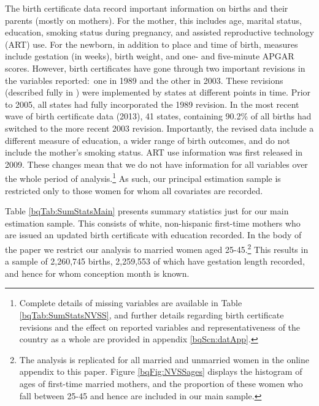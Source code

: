\documentclass[a4paper, 12 pt]{article}
\theoremstyle{plain}
\begin{document}
\begin{doublespace}
The birth certificate data record important information on births and their parents (mostly on mothers). For the mother, this includes age, marital status, education, smoking status during pregnancy, and assisted reproductive technology (ART) use. For the newborn, in addition to place and time of birth, measures include gestation (in weeks), birth weight, and one- and five-minute APGAR scores. However, birth certificates have gone through two important revisions in the variables reported:\ one in 1989 and the other in 2003.  These revisions (described fully in \citealp{NCHS2000}) were implemented by states at different points in time.  Prior to 2005, all states had fully incorporated the 1989 revision.  In the most recent wave of birth certificate data (2013), 41 states, containing 90.2\% of all births had switched to the more recent 2003 revision.  Importantly, the revised data include a different measure of education, a wider range of birth outcomes, and do not include the mother's smoking status. ART use information was first released in 2009. These changes mean that we do not have information for all variables over the whole period of analysis.\footnote{Complete details of missing variables are available in Table \ref{bqTab:SumStatsNVSS}, and further details regarding birth certificate revisions and the effect on reported variables and representativeness of the country as a whole are provided in appendix \ref{bqScn:datApp}.}  As such, our principal estimation sample is restricted only to those women for whom all covariates are recorded.  

Table \ref{bqTab:SumStatsMain} presents summary statistics just for our main estimation sample.  This consists of white, non-hispanic first-time mothers who are issued an updated birth certificate with education recorded. In the body of the paper we restrict our analysis to married women aged 25-45.\footnote{The analysis is replicated for all married and unmarried women in the online appendix to this paper.  Figure \ref{bqFig:NVSSages} displays the histogram of ages of first-time married mothers, and the proportion of these women who fall between 25-45 and hence are included in our main sample.}  This results in a sample of 2,260,745 births, 2,259,553 of which have gestation length recorded, and hence for whom conception month is known.



\end{doublespace}
\end{document}
